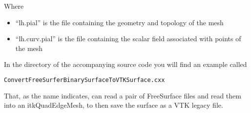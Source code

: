 \documentclass{InsightArticle}
\begin{document}
Where 

\begin{itemize}
\item ``lh.pial'' is the file containing the geometry and topology of the mesh
\item ``lh.curv.pial'' is the file containing the scalar field associated with points of the mesh
\end{itemize}

In the  directory of the accompanying source code you will find an example called

\begin{verbatim} 
ConvertFreeSurferBinarySurfaceToVTKSurface.cxx
\end{verbatim} 

That, as the name indicates, can read a pair of FreeSurface files and read them
into an itkQuadEdgeMesh, to then save the surface as a VTK legacy file.
\end{document}
